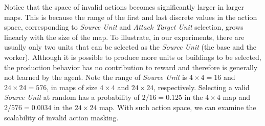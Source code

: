 \documentclass[letterpaper]{article}
\begin{document}


Notice that the space of invalid actions becomes significantly larger in larger maps. This is because the range of the first and last discrete values in the action space, corresponding to {\em Source Unit} and {\em Attack Target Unit} selection, grows linearly with the size of the map. To illustrate, in our experiments, there are usually only two units that can be selected as the {\em Source Unit} (the base and the worker).  Although it is possible to produce more units or buildings to be selected, the production behavior has no contribution to reward and therefore is generally not learned by the agent. Note the range of {\em Source Unit} is $4\times4=16$ and $24\times24=576$, in maps of size $4\times4$ and $24\times24$, respectively. Selecting a valid {\em Source Unit} at random has a probability of $2/16=0.125$ in the $4\times4$ map and $2/576=0.0034$ in the $24\times24$ map. With such action space, we can examine the scalability of invalid action masking.
\end{document}
